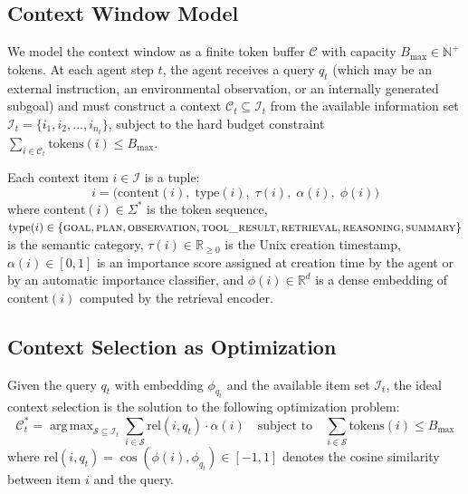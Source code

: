 \documentclass[review,12pt]{elsarticle}
\newcommand{\RR}{\mathbb{R}}
\newcommand{\NN}{\mathbb{N}}
\DeclareMathOperator*{\argmax}{arg\,max}
\newcommand{\rel}{\mathrm{rel}}
\newcommand{\tokens}{\mathrm{tokens}}
\begin{document}
\subsection{Context Window Model}
\label{subsec:context-model}

We model the context window as a finite token buffer $\mathcal{C}$ with
capacity $B_{\max} \in \NN^+$ tokens.  At each agent step $t$, the agent
receives a query $q_t$ (which may be an external instruction, an environmental
observation, or an internally generated subgoal) and must construct a context
$\mathcal{C}_t \subseteq \mathcal{I}_t$ from the available information set
$\mathcal{I}_t = \{i_1, i_2, \ldots, i_{n_t}\}$, subject to the hard budget
constraint $\sum_{i \in \mathcal{C}_t} \tokens(i) \leq B_{\max}$.

Each context item $i \in \mathcal{I}$ is a tuple:
\begin{equation}
  i = \bigl(\text{content}(i),\; \text{type}(i),\; \tau(i),\; \alpha(i),\; \phi(i)\bigr)
  \label{eq:item-tuple}
\end{equation}
where $\text{content}(i) \in \Sigma^*$ is the token sequence,
$\text{type}(i) \in \{\textsc{goal}, \textsc{plan}, \textsc{observation},
\textsc{tool\_result}, \textsc{retrieval}, \textsc{reasoning},
\textsc{summary}\}$ is the semantic category,
$\tau(i) \in \RR_{\geq 0}$ is the Unix creation timestamp,
$\alpha(i) \in [0,1]$ is an importance score assigned at creation time by the
agent or by an automatic importance classifier,
and $\phi(i) \in \RR^d$ is a dense embedding of $\text{content}(i)$ computed
by the retrieval encoder.

\subsection{Context Selection as Optimization}
\label{subsec:optimization}

Given the query $q_t$ with embedding $\phi_{q_t}$ and the available item set
$\mathcal{I}_t$, the ideal context selection is the solution to the
following optimization problem:
\begin{equation}
  \mathcal{C}^*_t =
  \argmax_{\mathcal{S} \subseteq \mathcal{I}_t}
  \sum_{i \in \mathcal{S}} \rel(i, q_t) \cdot \alpha(i)
  \quad \text{subject to} \quad
  \sum_{i \in \mathcal{S}} \tokens(i) \leq B_{\max}
  \label{eq:selection-problem}
\end{equation}
where $\rel(i, q_t) = \cos(\phi(i), \phi_{q_t}) \in [-1, 1]$ denotes the
cosine similarity between item $i$ and the query.
\end{document}
